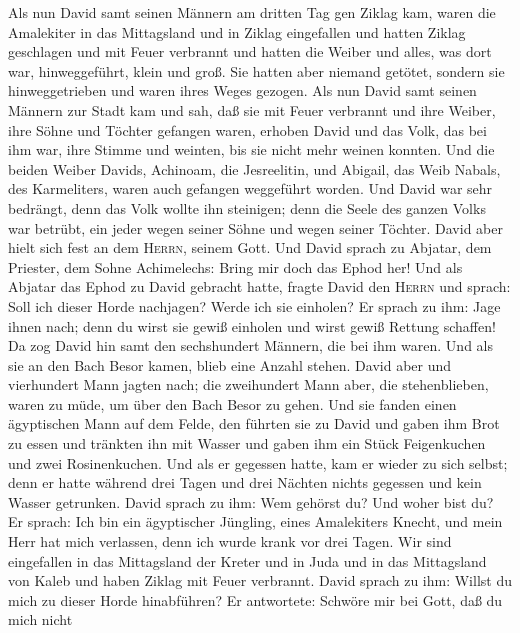 Als nun David samt seinen Männern am dritten Tag gen
Ziklag kam, waren die Amalekiter in das Mittagsland und in Ziklag
eingefallen und hatten Ziklag geschlagen und mit Feuer verbrannt
 und hatten die Weiber und alles, was dort war,
hinweggeführt, klein und groß. Sie hatten aber niemand getötet, sondern
sie hinweggetrieben und waren ihres Weges gezogen.  Als
nun David samt seinen Männern zur Stadt kam und sah, daß sie mit Feuer
verbrannt und ihre Weiber, ihre Söhne und Töchter gefangen waren,
 erhoben David und das Volk, das bei ihm war, ihre Stimme
und weinten, bis sie nicht mehr weinen konnten.  Und die
beiden Weiber Davids, Achinoam, die Jesreelitin, und Abigail, das Weib
Nabals, des Karmeliters, waren auch gefangen weggeführt worden.
 Und David war sehr bedrängt, denn das Volk wollte ihn
steinigen; denn die Seele des ganzen Volks war betrübt, ein jeder wegen
seiner Söhne und wegen seiner Töchter.  David aber hielt
sich fest an dem \textsc{Herrn}, seinem Gott. Und David sprach zu
Abjatar, dem Priester, dem Sohne Achimelechs: Bring mir doch das Ephod
her! Und als Abjatar das Ephod zu David gebracht hatte, 
fragte David den \textsc{Herrn} und sprach: Soll ich dieser Horde
nachjagen? Werde ich sie einholen? Er sprach zu ihm: Jage ihnen nach;
denn du wirst sie gewiß einholen und wirst gewiß Rettung schaffen!
 Da zog David hin samt den sechshundert Männern, die bei
ihm waren. Und als sie an den Bach Besor kamen, blieb eine Anzahl
stehen.  David aber und vierhundert Mann jagten nach; die
zweihundert Mann aber, die stehenblieben, waren zu müde, um über den
Bach Besor zu gehen.  Und sie fanden einen ägyptischen
Mann auf dem Felde, den führten sie zu David und gaben ihm Brot zu essen
und tränkten ihn mit Wasser  und gaben ihm ein Stück
Feigenkuchen und zwei Rosinenkuchen. Und als er gegessen hatte, kam er
wieder zu sich selbst; denn er hatte während drei Tagen und drei Nächten
nichts gegessen und kein Wasser getrunken.  David sprach
zu ihm: Wem gehörst du? Und woher bist du? Er sprach: Ich bin ein
ägyptischer Jüngling, eines Amalekiters Knecht, und mein Herr hat mich
verlassen, denn ich wurde krank vor drei Tagen.  Wir sind
eingefallen in das Mittagsland der Kreter und in Juda und in das
Mittagsland von Kaleb und haben Ziklag mit Feuer verbrannt.
 David sprach zu ihm: Willst du mich zu dieser Horde
hinabführen? Er antwortete: Schwöre mir bei Gott, daß du mich nicht
